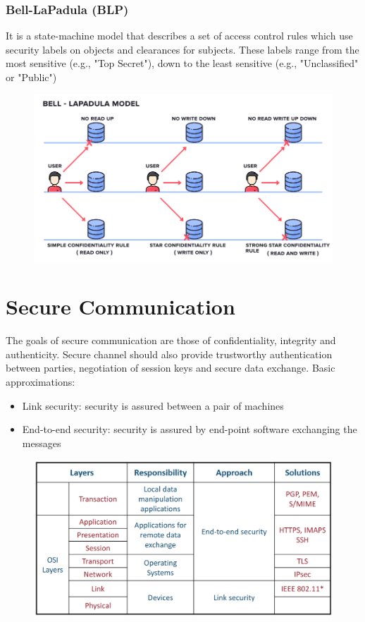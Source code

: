 \documentclass[10pt,a4paper]{report}
\begin{document}
\subsubsection{Bell-LaPadula (BLP)}
It is a state-machine model that describes a set of access control rules which use security labels on objects and clearances for subjects. These labels range from the most sensitive (e.g., "Top Secret"), down to the least sensitive (e.g., "Unclassified" or "Public")
\begin{figure}[H]
\centering
\includegraphics[scale=0.4]{32.png}
\end{figure}
\section{Secure Communication}
The goals of secure communication are those of confidentiality, integrity and authenticity. Secure channel should also provide trustworthy authentication between parties, negotiation of session keys and secure data exchange. Basic approximations:
\begin{itemize}
\item Link security: security is assured between a pair of machines
\item End-to-end security: security is assured by end-point software exchanging
the messages
\end{itemize}
\begin{figure}[H]
\centering
\includegraphics[scale=0.4]{33.png}
\end{figure}
\end{document}
